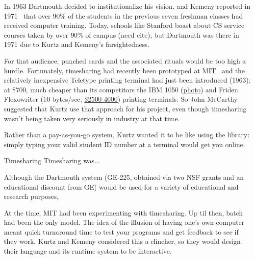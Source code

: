 \documentclass{article}
\begin{document}
In 1963 Dartmouth decided to
institutionalize his vision, and Kemeny reported in
1971~\cite{man_and_computer} that
over 90\% of the students in the previous seven freshman classes had
received computer training.  Today, schools like Stanford boast about
CS service courses taken by over 90\% of campus (need cite), but
Dartmouth was there in 1971 due to Kurtz and Kemeny's farsightedness.

For that audience, punched cards and the associated rituals would be too
high a hurdle.
Fortunately, timesharing had recently been prototyped at
MIT~\cite{corbato62timesharing} and the relatively inexpensive Teletype
 printing terminal had just been introduced (1963); at \$700,
much cheaper than its competitors the IBM 1050
(\href{http://www.science.uva.nl/museum/ibm1050.php}{photo}) and
Friden Flexowriter (10 bytes/sec,
\href{http://retrotechnology.com/herbs_stuff/flex_behr.html}{\$2500-4000})
printing terminals.
So John McCarthy suggested that Kurtz use that approach for his project,
even though timesharing wasn't being taken very seriously in industry at
that time.

Rather than a
pay-as-you-go system, Kurtz wanted it to be like using the library:
simply typing your valid student ID number at a terminal would get you
online.



\begin{milestone}{Timesharing}
 Timesharing was...
\end{milestone}


Although the Dartmouth system (GE-225, obtained via two NSF grants and
an educational discount from GE) would be used for a variety of
educational and research purposes, 

At the time, MIT had been experimenting with timesharing.
 Up til then,
batch had been the only model.  The idea of the illusion of having one's
own computer meant quick turnaround time to test your programs and get
feedback to see if they work.  Kurtz and Kemeny considered this a
clincher, so they would design their language and its runtime system to
be interactive.
\end{document}
